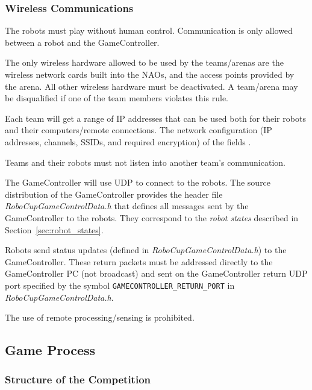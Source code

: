 \subsubsection{Wireless Communications}
\label{sec:wireless}
The robots must play without human control. Communication is only allowed between a robot and the GameController.

The only wireless hardware allowed to be used by the teams/arenas are the wireless network cards built into the NAOs, and the access points provided by the arena. All other wireless hardware must be deactivated. A team/arena may be disqualified if one of the team members violates this rule.

Each team will get a range of IP addresses that can be used both for their robots and their computers/remote connections. The network configuration (\eg IP addresses, channels, SSIDs, and required encryption) of the fields .

Teams and their robots must not listen into another team's communication.

The GameController will use UDP to connect to the robots. The source distribution of the GameController provides the header file \emph{RoboCupGameControlData.h} that defines all messages sent by the GameController to the robots. They correspond to the \emph{robot states} described in Section~\ref{sec:robot_states}.

Robots send status updates (defined in \emph{RoboCupGameControlData.h}) to the GameController. These return packets must be addressed directly to the GameController PC (\ie not broadcast) and sent on the GameController return UDP port specified by the symbol \verb!GAMECONTROLLER_RETURN_PORT! in \emph{RoboCupGameControlData.h}.

The use of remote processing/sensing is prohibited.

\subsection{Game Process}
\label{sec:game_process}

\subsubsection{Structure of the Competition}
\label{sec:game_struct}

 \\
	
